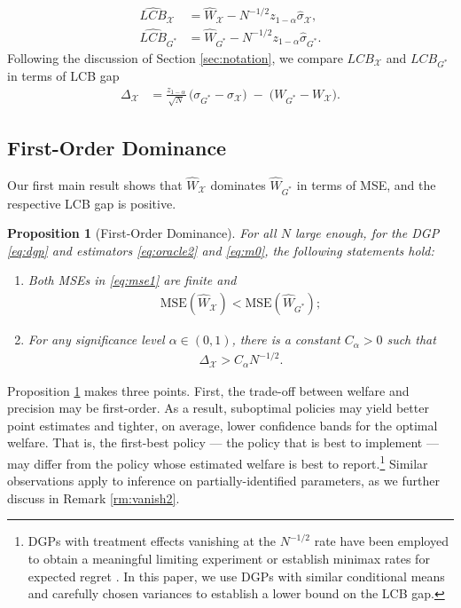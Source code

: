 \documentclass[12pt]{article}
\numberwithin{equation}{section}
\theoremstyle{plain}                         %
\newtheorem{proposition}{Proposition}
\theoremstyle{definition}                  %
\theoremstyle{remark}                      %
\begin{document}
\begin{align}
\widehat{LCB}_{\mathcal{X}} &= \widehat{W}_{\mathcal{X}} -  N^{-1/2} z_{1-\alpha} \widehat{\sigma}_{\mathcal{X}}, \label{eq:lcb0} \\[2mm]
\widehat{LCB}_{G^{*}} &= \widehat{W}_{G^{*}} - N^{-1/2} z_{1-\alpha} \widehat{\sigma}_{G^{*}}.  \label{eq:lcbfb} 
\end{align}
Following the discussion of Section \ref{sec:notation}, we compare ${LCB}_{\mathcal{X}}$ and ${LCB}_{G^{*}}$ in terms of LCB gap 
\begin{align}
\label{eq:LCBgap}
\Delta_{\mathcal X}
&= \frac{z_{1-\alpha}}{\sqrt{N}}\,\bigl(\sigma_{G^*} - \sigma_{\mathcal X}\bigr)
\;-\; \bigl(W_{G^*} - W_{\mathcal X}\bigr).
\end{align}



\subsection{First-Order Dominance}
\label{sec:mainr}

Our first main result shows that $\widehat{W}_{\mathcal{X}}$ dominates $\widehat{W}_{G^{*}}$ in terms of MSE, and the respective LCB gap is positive.

\begin{proposition}[First-Order Dominance]
\label{thm:main1}
For all $N$ large enough, for the DGP \eqref{eq:dgp} and estimators \eqref{eq:oracle2} and \eqref{eq:m0}, the following statements hold:
 \begin{enumerate}
     \item Both MSEs in \eqref{eq:mse1} are finite and
\begin{align}
\text{MSE} (\widehat{W}_{\mathcal{X}})  < \text{MSE} (\widehat{W}_{G^{*}});\label{eq:mse}
\end{align}
\item For any significance level $\alpha \in (0,1)$, there is a constant $C_{\alpha}>0$ such that
\begin{align}
\Delta_{\mathcal{X}}  >  C_{\alpha} N^{-1/2}. \label{eq:mainstatement}
\end{align} 
 \end{enumerate}
 
\end{proposition}

Proposition \ref{thm:main1} makes three points. First, the trade-off between welfare and precision may be first-order. As a result, suboptimal policies may yield better point estimates and tighter, on average, lower confidence bands for the optimal welfare. That is, the first-best policy --- the policy that is best to implement --- may differ from the policy whose estimated welfare is best to report.\footnote{DGPs with treatment effects vanishing at the $N^{-1/2}$ rate have been employed to obtain a meaningful limiting experiment \citep{HiranoPorter2009} or establish minimax rates for expected regret \citep{KitagawaTetenov, AtheyWager2}. In this paper, we use DGPs with similar conditional means and carefully chosen variances to establish a lower bound on the LCB gap.} Similar observations apply to inference on partially-identified parameters, as we further discuss in Remark \ref{rm:vanish2}.
\end{document}
